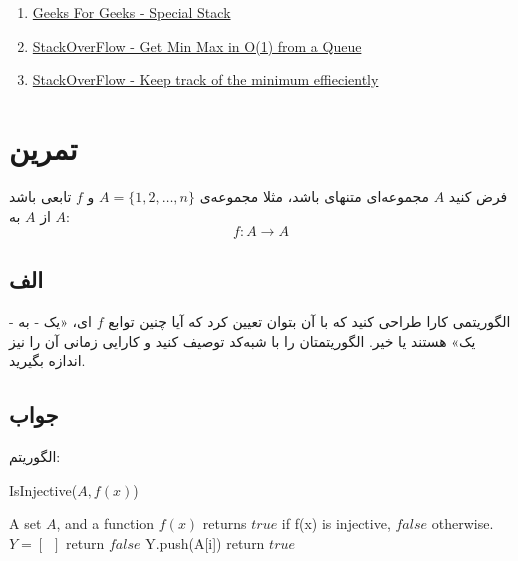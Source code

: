 \documentclass[]{article}
\begin{document}
\begin{latin}
    
    \begin{enumerate}
        \item \href{https://www.geeksforgeeks.org/design-and-implement-special-stack-data-structure/amp/}{Geeks For Geeks - Special Stack}
        \item \href{https://stackoverflow.com/questions/12054415/get-min-max-in-o1-time-from-a-queue/12054481#12054481}{StackOverFlow - Get Min Max in O(1) from a Queue}
        \item \href{https://stackoverflow.com/questions/33973/how-do-i-efficiently-keep-track-of-the-smallest-element-in-a-collection}{StackOverFlow - Keep track of the minimum effieciently}
    \end{enumerate}
    \end{latin}
    
    \pagebreak
    
    \section{تمرین}
    فرض کنید
    $A$
    مجموعه‌ای متنهای باشد، مثلا مجموعه‌ی
    $A = \{1, 2, \ldots, n\}$
    و
    $f$
    تابعی باشد از 
    $A$ 
    به 
    $A$: 
    $$f: A \rightarrow{A}$$
    \subsection{الف}
    الگوریتمی کارا طراحی کنید که با آن بتوان تعیین کرد که آیا چنین توابع
    $f$ 
    ای، «یک - به - یک» هستند یا خیر. الگوریتمتان را با شبه‌کد توصیف کنید و کارایی زمانی آن را نیز اندازه بگیرید.
    \subsection*{جواب}
    الگوریتم:
    
    \begin{latin}
        \begin{algorithm}
        \caption{IsInjective($A, f(x)$)}
            \begin{algorithmic}
                \Require A set $A$, and a function $f(x)$
                \Ensure returns $true$ if f(x) is injective, $false$ otherwise.
                \State $Y = [\, \, \,]$
                        \State return $false$
                    \Else
                        \State Y.push(A[i])
                    \EndIf
                \EndFor
                \State return $true$ 
            \end{algorithmic}
        \end{algorithm}
    \end{latin}
    
\end{document}
